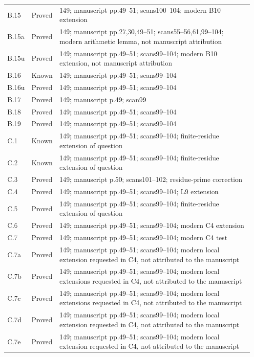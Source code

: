 {\begin{longtable}{p{1.9cm}p{1.7cm}p{10.3cm}}
B.15 & Proved & 149; manuscript pp.49–51; scans100–104; modern B10 extension \\
B.15a & Proved & 149; manuscript pp.27,30,49–51; scans55–56,61,99–104; modern arithmetic lemma, not manuscript attribution \\
B.15u & Proved & 149; manuscript pp.49–51; scans99–104; modern B10 extension, not manuscript attribution \\
B.16 & Known & 149; manuscript pp.49–51; scans99–104 \\
B.16u & Proved & 149; manuscript pp.49–51; scans99–104 \\
B.17 & Proved & 149; manuscript p.49; scan99 \\
B.18 & Proved & 149; manuscript pp.49–51; scans99–104 \\
B.19 & Proved & 149; manuscript pp.49–51; scans99–104 \\
C.1 & Known & 149; manuscript pp.49–51; scans99–104; finite-residue extension of question \\
C.2 & Known & 149; manuscript pp.49–51; scans99–104; finite-residue extension of question \\
C.3 & Proved & 149; manuscript p.50; scans101–102; residue-prime correction \\
C.4 & Proved & 149; manuscript pp.49–51; scans99–104; L9 extension \\
C.5 & Proved & 149; manuscript pp.49–51; scans99–104; finite-residue extension of question \\
C.6 & Proved & 149; manuscript pp.49–51; scans99–104; modern C4 extension \\
C.7 & Proved & 149; manuscript pp.49–51; scans99–104; modern C4 test \\
C.7a & Proved & 149; manuscript pp.49–51; scans99–104; modern local extension requested in C4, not attributed to the manuscript \\
C.7b & Proved & 149; manuscript pp.49–51; scans99–104; modern local extensions requested in C4, not attributed to the manuscript \\
C.7c & Proved & 149; manuscript pp.49–51; scans99–104; modern local extensions requested in C4, not attributed to the manuscript \\
C.7d & Proved & 149; manuscript pp.49–51; scans99–104; modern local extension requested in C4, not attributed to the manuscript \\
C.7e & Proved & 149; manuscript pp.49–51; scans99–104; modern local extension requested in C4, not attributed to the manuscript \\

\end{longtable}}
